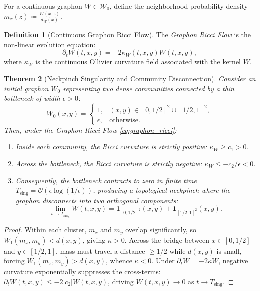 \documentclass[11pt,a4paper,reqno]{amsart}
\newtheorem{theorem}{Theorem}[section]
\theoremstyle{definition}
\newtheorem{definition}[theorem]{Definition}
\numberwithin{equation}{section}
\begin{document}
For a continuous graphon $W \in \mathcal{W}_0$, define the neighborhood probability density $m_x(z) \coloneqq \frac{W(x, z)}{d_W(x)}$.

\begin{definition}[Continuous Graphon Ricci Flow]
The \emph{Graphon Ricci Flow} is the non-linear evolution equation:
\begin{equation}
    \label{eq:graphon_ricci}
    \partial_t W(t, x, y) = -2 \kappa_W(t, x, y) W(t, x, y),
\end{equation}
where $\kappa_W$ is the continuous Ollivier curvature field associated with the kernel $W$.
\end{definition}

\begin{theorem}[Neckpinch Singularity and Community Disconnection]
\label{thm:ricci_neckpinch}
Consider an initial graphon $W_0$ representing two dense communities connected by a thin bottleneck of width $\epsilon > 0$:
\begin{equation}
    W_0(x, y) = \begin{cases} 1, & (x, y) \in [0, 1/2]^2 \cup [1/2, 1]^2, \\ \epsilon, & \text{otherwise}. \end{cases}
\end{equation}
Then, under the Graphon Ricci Flow \eqref{eq:graphon_ricci}:
\begin{enumerate}[label=(\roman*)]
    \item Inside each community, the Ricci curvature is strictly positive: $\kappa_W \ge c_1 > 0$.
    \item Across the bottleneck, the Ricci curvature is strictly negative: $\kappa_W \le -c_2 / \epsilon < 0$.
    \item Consequently, the bottleneck contracts to zero in finite time $T_{\mathrm{sing}} = \mathcal{O}(\epsilon \log(1/\epsilon))$, producing a topological neckpinch where the graphon disconnects into two orthogonal components:
    \begin{equation}
        \lim_{t \to T_{\mathrm{sing}}} W(t, x, y) = \mathbf{1}_{[0, 1/2]^2}(x, y) + \mathbf{1}_{[1/2, 1]^2}(x, y).
    \end{equation}
\end{enumerate}
\end{theorem}
\begin{proof}
Within each cluster, $m_x$ and $m_y$ overlap significantly, so $W_1(m_x, m_y) < d(x, y)$, giving $\kappa > 0$. Across the bridge between $x \in [0, 1/2]$ and $y \in [1/2, 1]$, mass must travel a distance $\ge 1/2$ while $d(x, y)$ is small, forcing $W_1(m_x, m_y) > d(x, y)$, whence $\kappa < 0$. Under $\partial_t W = -2\kappa W$, negative curvature exponentially suppresses the cross-terms: $\partial_t W(t, x, y) \le -2 |c_2| W(t, x, y)$, driving $W(t, x, y) \to 0$ as $t \to T_{\mathrm{sing}}$.
\end{proof}
\end{document}
